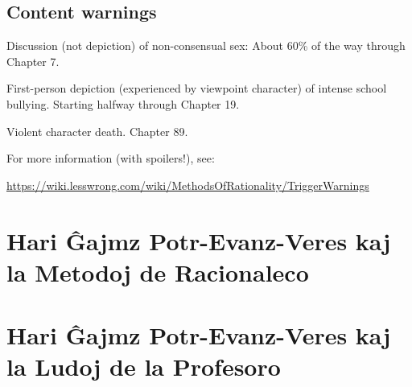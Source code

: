 \RequirePackage[pdf]{layout/hp-book}


{
\pagestyle{empty}



\chapter*{Content warnings}
\thispagestyle{empty}

Discussion (not depiction) of non-consensual sex: About 60\% of the way through Chapter 7.

First-person depiction (experienced by viewpoint character) of intense school bullying. Starting halfway through Chapter 19.

Violent character death. Chapter 89.

For more information (with spoilers!), see:
\begin{center}\url{https://wiki.lesswrong.com/wiki/MethodsOfRationality/TriggerWarnings}\end{center}


\cleartorecto
}
\setcounter{page}{1}


\part{Hari Ĝajmz Potr-Evanz-Veres kaj la Metodoj de Racionaleco}

% 
% 
% 
% 
% 
% 
% 
% 
% 
% 
% 
% 
% 
% 
% 
% 
% 
% 
% 
\part{Hari Ĝajmz Potr-Evanz-Veres kaj la Ludoj de la Profesoro}
% 
% 
% 
% 
% 
% 
% 
% 
% 
% 
% 
% 
% 
% 
% 
% 
